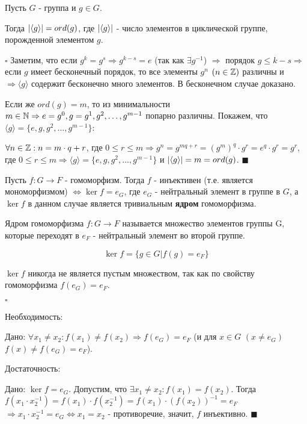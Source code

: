 \documentclass[../main.tex]{subfiles}
\begin{document}
 Пусть $G$ - группа и $g\in G$.

Тогда $\vert \langle g\rangle\vert = ord(g)$, где $\vert \langle g\rangle\vert$ - число элементов в циклической группе, порожденной элементом $g$.

\void
$\square$ Заметим, что если $g^k = g^s \Rightarrow g^{k-s} = e$ (так как $\exists g^{-1}$) $\Rightarrow$
порядок $g \leq k - s \Rightarrow$ если $g$ имеет бесконечный порядок, то все элементы $g^n$ $(n\in\mathbb{Z})$
различны и $\Rightarrow \langle g\rangle$ содержит бесконечно много элементов. В бесконечном случае доказано.

\void
Если же $ord(g) = m$, то из минимальности $m\in\mathbb{N} \Rightarrow e=g^0, g=g^1, g^2,\dots,g^{m-1}$ попарно
различны. Покажем, что $\langle g\rangle = \{e, g, g^2,\dots,g^{m-1}\}$:

$\forall n\in\mathbb{Z}: n = m\cdot q + r$, где $0\leq r \le m \Rightarrow g^n = g^{mq+r} = (g^m)^q\cdot g^r =
e^q\cdot g^r = g^r$, где $0\leq r\le m \Rightarrow \langle g\rangle = \{e,g,g^2,\dots,g^{m-1}\}$
и $\vert \langle g\rangle\vert = m = ord(g)$. $\blacksquare$

\void
{} Пусть $f: G\rightarrow F$ - гомоморфизм. Тогда $f$ - инъективен (т.е. является мономорфизмом)
$\Leftrightarrow \ker{f} = e_G$, где $e_G$ - нейтральный элемент в группе в $G$, а $\ker{f}$ в данном
случае является тривиальным \textbf{ядром} гомоморфизма.

\void
{} Ядром гомоморфизма $f: G\rightarrow F$ называется множество элементов группы G, которые переходят
в $e_F$ - нейтральный элемент во второй группе.

$$\ker{f} = \{g\in G\vert f(g) = e_F\}$$

\void
{} $\ker{f}$ никогда не является пустым множеством, так как по свойству гомоморфизма $f(e_G) = e_F$.

\void
$\square$

\fbox{$\Rightarrow$} Необходимость:

Дано: $\forall x_1 \neq x_2: f(x_1)\neq f(x_2)\Rightarrow f(e_G) = e_F$ 
(и для $x\in G$ $(x\neq e_G)$ $f(x)\neq f(e_G) = e_F$).

\fbox{$\Leftarrow$} Достаточность:

Дано: $\ker{f} = e_G$. Допустим, что $\exists x_1\neq x_2: f(x_1) = f(x_2)$.
Тогда $f(x_1\cdot x_2^{-1}) = f(x_1)\cdot f(x_2^{-1}) = f(x_1)\cdot(f(x_2))^{-1} = e_F$
$\Rightarrow x_1\cdot x_2^{-1} = e_G \Leftrightarrow x_1 = x_2$ - противоречие, значит,
$f$ инъективно. $\blacksquare$
\end{document}

